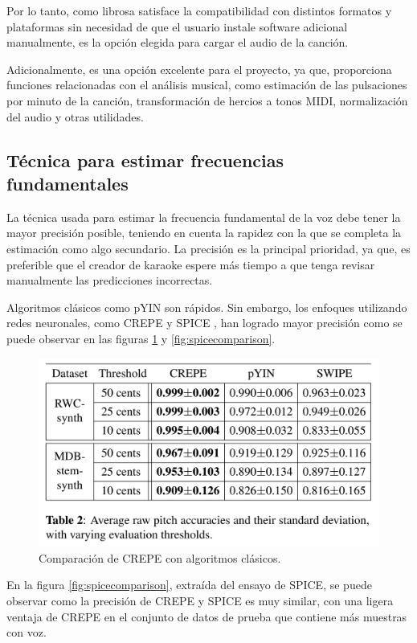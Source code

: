 Por lo tanto, como librosa satisface la compatibilidad con distintos formatos y plataformas sin necesidad de que el usuario instale software adicional manualmente, es la opción elegida para cargar el audio de la canción.

Adicionalmente, es una opción excelente para el proyecto, ya que, proporciona funciones relacionadas con el análisis musical, como estimación de las pulsaciones por minuto de la canción, transformación de hercios a tonos MIDI, normalización del audio y otras utilidades.

\subsection{Técnica para estimar frecuencias fundamentales}

La técnica usada para estimar la frecuencia fundamental de la voz debe tener la mayor precisión posible, teniendo en cuenta la rapidez con la que se completa la estimación como algo secundario. La precisión es la principal prioridad, ya que, es preferible que el creador de karaoke espere más tiempo a que tenga revisar manualmente las predicciones incorrectas.

Algoritmos clásicos como pYIN \cite{pYIN} son rápidos. Sin embargo, los enfoques utilizando redes neuronales, como CREPE \cite{CREPE} y SPICE \cite{SPICE}, han logrado mayor precisión como se puede observar en las figuras \ref{fig:crepecomparison} y \ref{fig:spicecomparison}.

\begin{figure}[h!]
	\centering
	\includegraphics[width=0.7\linewidth]{logos/crepe_comparison}
	\caption{Comparación de CREPE con algoritmos clásicos\protect\footnotemark.}
	\label{fig:crepecomparison}
\end{figure}


En la figura \ref{fig:spicecomparison}, extraída del ensayo de SPICE, se puede observar como la precisión de CREPE y SPICE es muy similar, con una ligera ventaja de CREPE en el conjunto de datos de prueba que contiene más muestras con voz.


